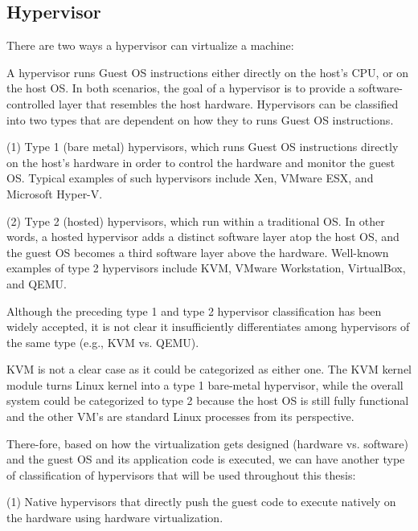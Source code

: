 \documentclass{report}
\begin{document}
\begin{spacing}{1.5}
\section{Hypervisor}

{\large
There are two ways a hypervisor can virtualize a machine:

A hypervisor runs Guest OS instructions either directly on the host's CPU, or on the host OS. In both scenarios, 
the goal of a hypervisor is to provide a software-controlled layer that resembles the host hardware. Hypervisors 
can be classified into two types that are dependent on how they to runs Guest OS instructions.
\newline
}

{\large 
(1) Type 1 (bare metal) hypervisors, which runs Guest OS instructions directly on the host’s hardware in order to control
the hardware and monitor the guest OS. Typical examples of such hypervisors include Xen, VMware ESX, and Microsoft Hyper-V.
\newline
}

{\large
(2) Type 2 (hosted) hypervisors, which run within a traditional OS. In other words, a
hosted hypervisor adds a distinct software layer atop the host OS, and the guest OS becomes a third
software layer above the hardware. Well-known examples of type 2 hypervisors include KVM, 
VMware Workstation, VirtualBox, and QEMU.
\newline
}

{\large
Although the preceding type 1 and type 2 hypervisor classification has been widely
accepted, it is not clear it insufficiently differentiates among hypervisors of the same type (e.g., KVM vs. QEMU).


KVM is not a clear case as it could be categorized as either one. The KVM kernel module turns Linux kernel into a type 1 bare-metal hypervisor, while the overall system could be categorized to type 2 because the host OS is still fully functional and the other VM's are standard Linux processes from its perspective.


There-fore, based on how the virtualization gets designed (hardware vs. software) and the guest OS and its 
application code is executed, we can have another type of classification of hypervisors that will be used 
throughout this thesis:
\newline
}

{\large
(1) Native hypervisors that directly push the guest code to execute natively on the
hardware using hardware virtualization.
\newline
}



\end{spacing}
\end{document}
